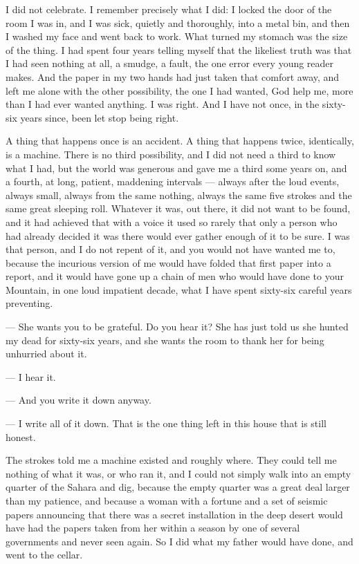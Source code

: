 I did not celebrate. I remember precisely what I did: I locked the door of the room I was in, and I was sick, quietly and thoroughly, into a metal bin, and then I washed my face and went back to work. What turned my stomach was the size of the thing. I had spent four years telling myself that the likeliest truth was that I had seen nothing at all, a smudge, a fault, the one error every young reader makes. And the paper in my two hands had just taken that comfort away, and left me alone with the other possibility, the one I had wanted, God help me, more than I had ever wanted anything. I was right. And I have not once, in the sixty-six years since, been let stop being right.\par

A thing that happens once is an accident. A thing that happens twice, identically, is a machine. There is no third possibility, and I did not need a third to know what I had, but the world was generous and gave me a third some years on, and a fourth, at long, patient, maddening intervals --- always after the loud events, always small, always from the same nothing, always the same five strokes and the same great sleeping roll. Whatever it was, out there, it did not want to be found, and it had achieved that with a voice it used so rarely that only a person who had already decided it was there would ever gather enough of it to be sure. I was that person, and I do not repent of it, and you would not have wanted me to, because the incurious version of me would have folded that first paper into a report, and it would have gone up a chain of men who would have done to your Mountain, in one loud impatient decade, what I have spent sixty-six careful years preventing.\par

\begin{room}

--- She wants you to be grateful. Do you hear it? She has just told us she hunted my dead for sixty-six years, and she wants the room to thank her for being unhurried about it.

--- I hear it.

--- And you write it down anyway.

--- I write all of it down. That is the one thing left in this house that is still honest.

\end{room}

The strokes told me a machine existed and roughly where. They could tell me nothing of what it was, or who ran it, and I could not simply walk into an empty quarter of the Sahara and dig, because the empty quarter was a great deal larger than my patience, and because a woman with a fortune and a set of seismic papers announcing that there was a secret installation in the deep desert would have had the papers taken from her within a season by one of several governments and never seen again. So I did what my father would have done, and went to the cellar.\par

